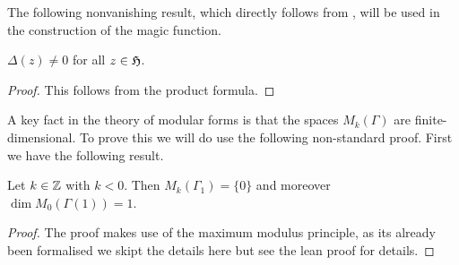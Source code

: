 The following nonvanishing result, which directly follows from , will be used in the construction of the magic function.
\begin{corollary}\label{cor:disc-nonvanishing}\leanok{}
$\Delta(z) \neq 0$ for all $z \in \mathfrak{H}$.
\end{corollary}
\begin{proof}
    \leanok
This follows from the product formula.
\end{proof}


A key fact in the theory of modular forms is that the spaces $M_k(\Gamma)$ are finite-dimensional.
To prove this we will do use the following non-standard proof. First we have the following result.

\begin{theorem}\label{thm:nonpos_wt}\leanok
    Let $k \in \mathbb{Z}$ with $k < 0$. Then $M_k(\Gamma_1) = \{0\}$ and moreover $\dim M_0(\Gamma(1)) = 1$.
\end{theorem}
\begin{proof}
    \leanok
    The proof makes use of the maximum modulus principle, as its already been formalised we skipt the details here but see the lean proof for details.
\end{proof}


